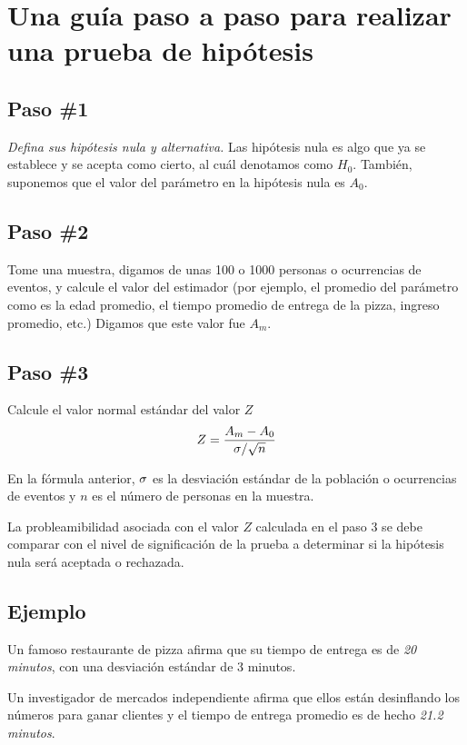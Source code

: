 \section{Una guía paso a paso para realizar una prueba de hipótesis}
\subsection{Paso \#1}
\emph{Defina sus hipótesis nula y alternativa.} Las hipótesis nula es algo que ya se establece y se acepta como cierto, al cuál denotamos como $H_{0}.$ También, suponemos que el valor del parámetro en la hipótesis nula es $A_{0}.$

\subsection{Paso \#2}
Tome una muestra, digamos de unas 100 o 1000 personas o ocurrencias de eventos, y calcule el valor del estimador (por ejemplo, el promedio del parámetro como es la edad promedio, el tiempo promedio de entrega de la pizza, ingreso promedio, etc.) Digamos que este valor fue $A_{m}.$

\subsection{Paso \#3}
Calcule el valor normal estándar del valor $Z$
\begin{align}
	Z=\dfrac{A_{m}-A_{0}}{\sigma/\sqrt{n}}
\end{align}



En la fórmula anterior, $\sigma$ es la desviación estándar de la población o ocurrencias de eventos y $n$ es el número de personas en la muestra.


La probleamibilidad asociada con el valor $Z$ calculada en el paso $3$ se debe comparar con el nivel de significación de la prueba a determinar si la hipótesis nula será aceptada o rechazada.

\subsection{Ejemplo}
Un famoso restaurante de pizza afirma que su tiempo de entrega es de \emph{20 minutos}, con una desviación estándar de 3 minutos. 

Un investigador de mercados independiente afirma que ellos están desinflando los números para ganar clientes y el tiempo de entrega promedio es de hecho \emph{21.2 minutos}.

